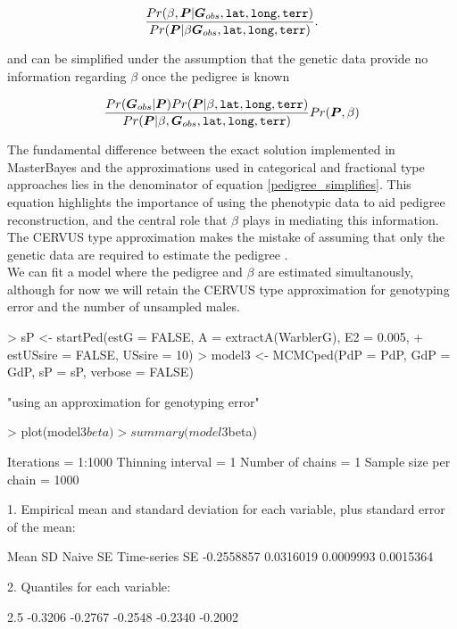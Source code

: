\documentclass{article}
\begin{document}
\begin{equation}
\frac{Pr(\beta,  {\bm P}| {\bm G}_{obs}, \textrm{\texttt{lat}}, \textrm{\texttt{long}}, \textrm{\texttt{terr}})}{Pr({\bm P}| \beta {\bm G}_{obs}, \textrm{\texttt{lat}}, \textrm{\texttt{long}}, \textrm{\texttt{terr}})}.
\label{pedigree_expanded}
\end{equation}

and can be simplified  under the assumption that the genetic data provide no information regarding $\beta$ once the pedigree is known

\begin{equation}
\frac{Pr({\bm G}_{obs} | {\bm P})Pr({\bm P} | \beta,\textrm{\texttt{lat}}, \textrm{\texttt{long}}, \textrm{\texttt{terr}})}{Pr({\bm P}| \beta, {\bm G}_{obs}, \textrm{\texttt{lat}}, \textrm{\texttt{long}}, \textrm{\texttt{terr}})}Pr({\bm P}, \beta)
\label{pedigree_simplifies}
\end{equation}

The fundamental difference between the exact solution implemented in MasterBayes and the approximations used in categorical and fractional type approaches lies in the denominator of equation \ref{pedigree_simplifies}.  This equation highlights the importance of using the phenotypic data to aid pedigree reconstruction, and the central role that $\beta$ plays in mediating this information.  The CERVUS type approximation makes the mistake of assuming that only the genetic data are required to estimate the pedigree \citep[see the information boxes in][]{Hadfield.2006c}.\\

  We can fit a model where the pedigree and $\beta$ are estimated simultanously, although for now we will retain the CERVUS type approximation for genotyping error and the number of unsampled males.

\begin{Schunk}
\begin{Sinput}
> sP <- startPed(estG = FALSE, A = extractA(WarblerG), E2 = 0.005, 
+     estUSsire = FALSE, USsire = 10)
> model3 <- MCMCped(PdP = PdP, GdP = GdP, sP = sP, verbose = FALSE)
\end{Sinput}
\begin{Soutput}
[1] "using an approximation for genotyping error"
\end{Soutput}
\begin{Sinput}
> plot(model3$beta)
> summary(model3$beta)
\end{Sinput}
\begin{Soutput}
Iterations = 1:1000
Thinning interval = 1 
Number of chains = 1 
Sample size per chain = 1000 

1. Empirical mean and standard deviation for each variable,
   plus standard error of the mean:

          Mean             SD       Naive SE Time-series SE 
    -0.2558857      0.0316019      0.0009993      0.0015364 

2. Quantiles for each variable:

   2.5%
-0.3206 -0.2767 -0.2548 -0.2340 -0.2002 
\end{Soutput}
\end{Schunk}
 
\end{document}
